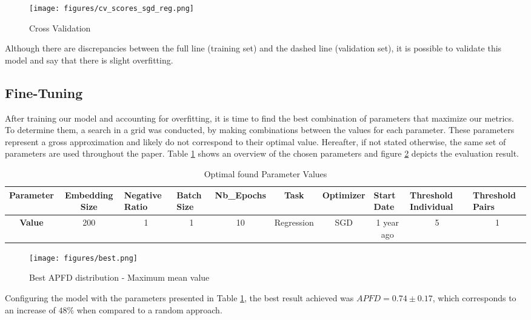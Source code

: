 \begin{figure}[h]
	\centering
	\texttt{[image: figures/cv\_scores\_sgd\_reg.png]}
	\caption{Cross Validation}
	\label{cv}
\end{figure}


Although there are discrepancies between the full line (training set) and the dashed line (validation set), it is possible to validate this model and say that there is slight overfitting. 

\subsection{Fine-Tuning}

After training our model and accounting for overfitting, it is time to find the best combination of parameters that maximize our metrics. To determine them, a search in a grid was conducted, by making combinations between the values for each parameter.
These parameters represent a gross approximation and likely do not correspond to their optimal value.  Hereafter, if not stated otherwise, the same set of parameters are used throughout the paper. 
Table \ref{paramtune} shows an overview of the chosen parameters and figure \ref{best_result} depicts the evaluation result.

\begin{table}[h]
	\begin{tabular}{cclllcllll}
		\hline
		\textbf{Parameter} & Embedding Size & Negative Ratio        & Batch Size            & Nb\_Epochs             & Task       & Optimizer               & Start Date                     & Threshold Individual  & Threshold Pairs       \\ \hline
		\textbf{Value}     & 200            & \multicolumn{1}{c}{1} & \multicolumn{1}{c}{1} & \multicolumn{1}{c}{10} & Regression & \multicolumn{1}{c}{SGD} & \multicolumn{1}{c}{1 year ago} & \multicolumn{1}{c}{5} & \multicolumn{1}{c}{1} \\ \hline
	\end{tabular}
	\caption{Optimal found Parameter Values}
	\label{paramtune}
\end{table}


\begin{figure}[h]
	\centering
	\texttt{[image: figures/best.png]}
	\caption{Best APFD distribution - Maximum mean value }
	\label{best_result}
\end{figure}

Configuring the model with the parameters presented in Table \ref{paramtune}, the best result achieved was $APFD = 0.74 \pm 0.17$, which corresponds to an increase of $48 \%$ when compared to a random approach.  


